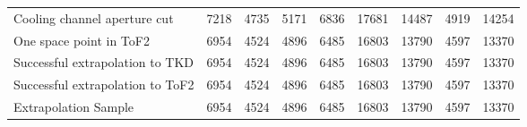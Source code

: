\begin{landscape}
\begin{table}
\begin{tabular}[pos]{l|cccccccc}
\hline                                            
Cooling channel aperture cut                       &    7218  &    4735  &    5171  &    6836  &   17681  &   14487  &    4919  &   14254  \\
One space point in ToF2                            &    6954  &    4524  &    4896  &    6485  &   16803  &   13790  &    4597  &   13370  \\
Successful extrapolation to TKD                    &    6954  &    4524  &    4896  &    6485  &   16803  &   13790  &    4597  &   13370  \\
Successful extrapolation to ToF2                   &    6954  &    4524  &    4896  &    6485  &   16803  &   13790  &    4597  &   13370  \\
\hline                                            
Extrapolation Sample                               &    6954  &    4524  &    4896  &    6485  &   16803  &   13790  &    4597  &   13370  \\
\hline                                            

\end{tabular}
\end{table}
\end{landscape}


